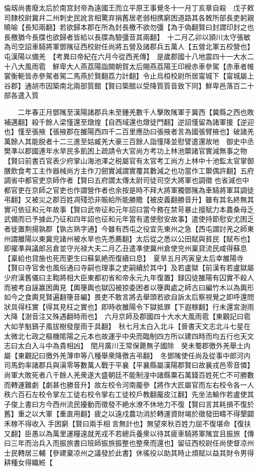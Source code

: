 倫刼尚書廢太后於南宫封帝為遠國王而立平原王事覺冬十一月丁亥章自殺　戊子敕司隸校尉冀幷二州刺史民訛言相驚弃捐舊居老弱相携窮困道路其各敇所部長吏躬親曉喻【長知兩翻】若欲歸本郡在所為封長檄不欲勿彊【為于偽翻賢曰封謂印封之也長檄猶今長牒也欲歸者皆給以長牒為驗彊音其兩翻】　十二月乙卯以頴川太守張敏為司空詔車騎將軍鄧隲征西校尉任尚將五營及諸郡兵五萬人【五營北軍五校營也】屯漢陽以備羌　【考異曰帝紀在六月今從西羌傳】　是歲郡國十八地震四十一大水二十八大風雨雹　鮮卑大人燕荔陽詣闕朝賀太后賜燕荔陽王印綬赤車參駕【赤車者帷裳衡軛皆赤參駕者駕二馬燕於賢翻荔力計翻】令止烏桓校尉所居甯城下【甯城屬上谷郡】通胡市因築南北兩部質館【賢曰築館以受降質質音致下同】鮮卑邑落百二十部各遣入質

　　二年春正月鄧隲至漢陽諸郡兵未至鍾羌數千人擊敗隲軍于冀西【冀縣之西也敗補邁翻】殺千餘人梁慬還至燉煌【自西域還也燉徒門翻】逆詔慬留為諸軍援【逆迎也】慬至張掖【張掖郡在雒陽西四千二百里應劭曰張掖者言為國張臂掖也】破諸羌萬餘人其能脱者十二三進至姑臧羌大豪三百餘人詣慬降並慰譬遣還故地　御史中丞樊凖以郡國連年水旱民多飢困上疏請令大官尚方考功上林池籞諸官實減無事之物【賢曰前書百官表少府掌山海池澤之税屬官有太官考工尚方上林中十池監太官掌御膳飲食考工主作器械尚方主作刀劒實減謂實覆其數減之也功當作工籞偶許翻】五府調省中都官吏京師作者【賢曰五府謂太傳太尉司徒司空大將軍也調徵也省減也中都官吏在京師之官吏也作謂營作者也余按是時不拜大將軍獨鄧隲為車騎將軍耳調徒弔翻】又被災之郡百姓凋殘恐非賑給所能勝贍【被皮義翻勝音升】雖有其名終無其實可依征和元年故事【賢曰武帝征和元年詔曰當今務在禁苛暴止擅賦力本農桑母乏武備而已予據此乃征和四年詔也征和元年當有遣使慰安故事】遣使持節慰安尤困乏者徙置荆揚孰郡【孰古熟字通】今雖有西屯之役宜先東州之急【西屯謂討羌之師東州謂雒陽以東冀兖諸州被水旱也先悉薦翻】太后從之悉以公田賦與貧民【賦布也】即擢凖與議郎呂倉並守光禄大夫二月乙丑遣凖使冀州倉使兖州稟貸流民咸得蘇息【稟給也貸施也死而更生曰蘇氣絶而復續曰息】　夏旱五月丙寅皇太后幸雒陽寺【賢曰寺官舍也風俗通曰寺嗣也理事之吏嗣續於其中】及若盧獄【前漢有若盧獄屬少府漢舊儀曰主鞫將相大臣東都初省和帝永元九年復置】録囚徒雒陽有囚實不殺人而被考自誣羸困輿見【輿箯輿也獄囚被掠委困者以箯輿處之師古曰編竹木以為輿形如今之食輿見賢遍翻箯音編】畏吏不敢言將去舉頭若欲自訴太后察視覺之即呼還問狀具得枉實【得其見枉之實也】即時收雒陽令下獄抵罪【下遐稼翻】行未還宮澍雨大降【澍音注又殊遇翻時雨也】　六月京師及郡國四十大水大風雨雹【東觀記曰雹大如芋魁鷄子風拔樹發屋雨于具翻】　秋七月太白入北斗【晉書天文志北斗七星在太微北七政之樞機隂陽之元本也故運乎中央而臨制四方所以建四時而均五行也天文志曰太白入斗中為貴相凶】　閏月廣川王常保薨無子國除　癸未蜀郡徼外羌舉土内屬【東觀記曰徼外羌薄申等八種舉衆降徼吉弔翻】　冬鄧隲使任尚及從事中郎河内司馬鈞率諸郡兵與滇零等數萬人戰于平襄【平襄縣屬漢陽郡賢曰故襄戎邑零音憐】尚軍大敗死者八千餘人羌衆遂大盛朝廷不能制湟中諸縣粟石萬錢百姓死亡不可勝數而轉運難劇【劇甚也勝音升】故左校令河南龎參【將作大匠屬官而左右校令各一人秩六百石左校令掌左工徒右校令掌右工徒校戶教翻龎皮江翻】先坐法輸作若盧使其子俊上書曰方今西州流民擾動而徵發不絶水潦不休地力不復【賢曰言其耗損不復於舊】重之以大軍【重直用翻】疲之以遠戍農功消於轉運資財竭於徵發田疇不得墾闢禾稼不得收入手困窮【賢曰兩手相言無計也】無望來秋百姓力屈不復堪命【復扶又翻】臣愚以為萬里運糧遠就羌戎不若總兵養衆以待其疲車騎將軍隲宜且振旅【傳曰三年而治兵入而振旅書曰班師振旅振整也整衆而還也】留征西校尉任尚使督凉州士民轉居三輔【參建棄凉州之議發於此書】休徭役以助其時止煩賦以益其財令男得耕種女得織絍【